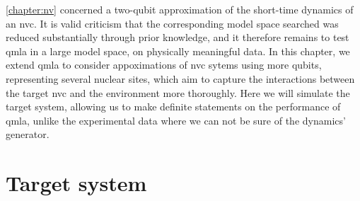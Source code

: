 \cref{chapter:nv} concerned a two-qubit approximation of the short-time dynamics of an \gls{nvc}. 
It is valid criticism that the corresponding \gls{model space} searched was reduced substantially through prior knowledge,
    and it therefore remains to test \gls{qmla} in a large model space, on physically meaningful data. 
In this chapter, we extend \gls{qmla} to consider appoximations of \gls{nvc} sytems using more qubits, 
    representing several nuclear sites, which aim to capture the interactions between the 
    target \gls{nvc} and the environment more thoroughly. 
Here we will simulate the target system, allowing us to make definite statements on the performance of \gls{qmla}, 
    unlike the experimental data where we can not be sure of the dynamics' generator.

\par 

\section{Target system}

